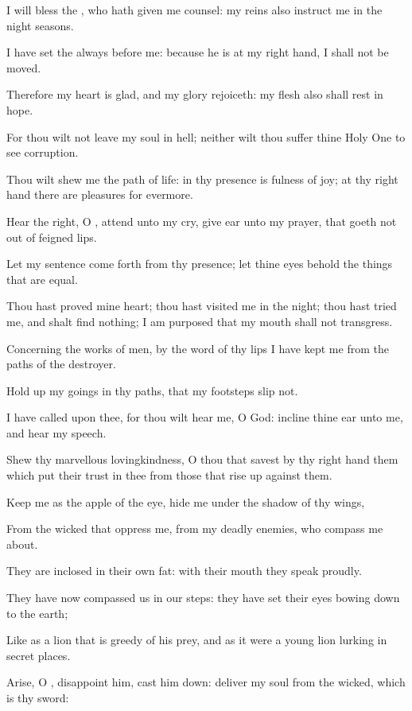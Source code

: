 \Verse I will bless the \LORD, who hath given me counsel: my reins also instruct me in the night seasons.

\Verse I have set the \LORD always before me: because he is at my right hand, I shall not be moved.

\Verse Therefore my heart is glad, and my glory rejoiceth: my flesh also shall rest in hope.

\Verse For thou wilt not leave my soul in hell; neither wilt thou suffer thine Holy One to see corruption.

\Verse Thou wilt shew me the path of life: in thy presence is fulness of joy; at thy right hand there are pleasures for evermore.




\Chapter
\Verse Hear the right, O \LORD, attend unto my cry, give ear unto my prayer, that goeth not out of feigned lips.

\Verse Let my sentence come forth from thy presence; let thine eyes behold the things that are equal.

\Verse Thou hast proved mine heart; thou hast visited me in the night; thou hast tried me, and shalt find nothing; I am purposed that my mouth shall not transgress.

\Verse Concerning the works of men, by the word of thy lips I have kept me from the paths of the destroyer.

\Verse Hold up my goings in thy paths, that my footsteps slip not.

\Verse I have called upon thee, for thou wilt hear me, O God: incline thine ear unto me, and hear my speech.

\Verse Shew thy marvellous lovingkindness, O thou that savest by thy right hand them which put their trust in thee from those that rise up against them.

\Verse Keep me as the apple of the eye, hide me under the shadow of thy wings,

\Verse From the wicked that oppress me, from my deadly enemies, who compass me about.

\Verse They are inclosed in their own fat: with their mouth they speak proudly.

\Verse They have now compassed us in our steps: they have set their eyes bowing down to the earth;

\Verse Like as a lion that is greedy of his prey, and as it were a young lion lurking in secret places.

\Verse Arise, O \LORD, disappoint him, cast him down: deliver my soul from the wicked, which is thy sword:

